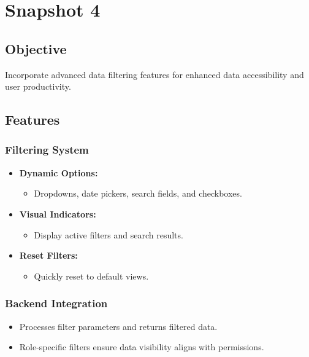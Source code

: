 \documentclass[12pt]{article}
\begin{document}
\section{Snapshot 4}
\subsection*{Objective}
Incorporate advanced data filtering features for enhanced data accessibility and user productivity.

\subsection*{Features}

\subsubsection*{Filtering System}
\begin{itemize}
    \item \textbf{Dynamic Options:}
    \begin{itemize}
        \item Dropdowns, date pickers, search fields, and checkboxes.
    \end{itemize}
    \item \textbf{Visual Indicators:}
    \begin{itemize}
        \item Display active filters and search results.
    \end{itemize}
    \item \textbf{Reset Filters:}
    \begin{itemize}
        \item Quickly reset to default views.
    \end{itemize}
\end{itemize}

\subsubsection*{Backend Integration}
\begin{itemize}
    \item Processes filter parameters and returns filtered data.
    \item Role-specific filters ensure data visibility aligns with permissions.
\end{itemize}
\end{document}
